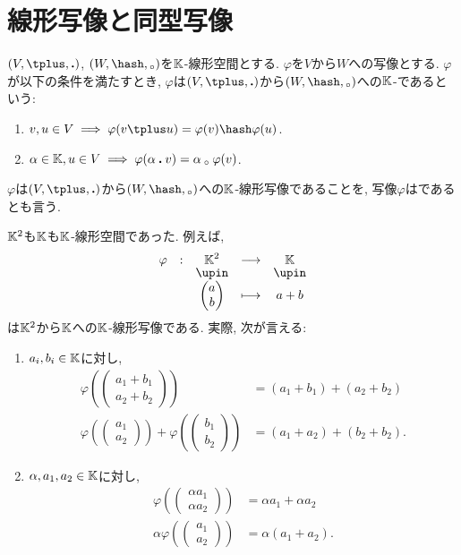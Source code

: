 \section{線形写像と同型写像}
\label{sec:linmap:def}
\begin{definition}
  $(V,\plus,\act)$, $(W,\pplus,\aact)$を$\mathbb{K}$-線形空間とする.
  $\varphi$を$V$から$W$への写像とする.
  $\varphi$が以下の条件を満たすとき,
  $\varphi$は$(V,\plus,\act)$から$(W,\pplus,\aact)$への$\mathbb{K}$-であるという:
  \begin{enumerate}
    \item $v,u\in V\implies \varphi(v\plus u)=\varphi(v)\pplus\varphi(u)$.
    \item $\alpha\in \mathbb{K}, u\in V\implies \varphi(\alpha\mathbin{\boldsymbol{.}} v)=\alpha\mathbin{{}_\circ}\varphi(v)$.
  \end{enumerate}
  $\varphi$は$(V,\plus,\act)$から$(W,\pplus,\aact)$への$\mathbb{K}$-線形写像であることを,
  写像$\varphi$はであるとも言う.
\end{definition}

\begin{example}
$\mathbb{K}^2$も$\mathbb{K}$も$\mathbb{K}$-線形空間であった.
例えば,
\begin{align*}
\shazo{\varphi}{\KK^2}{\KK}
{\begin{pmatrix}a\\b\end{pmatrix}}{a+b}
\end{align*}
は$\mathbb{K}^2$から$\mathbb{K}$への$\mathbb{K}$-線形写像である.
実際, 次が言える:
  \begin{enumerate}
    \item
    $a_i,b_i\in \mathbb{K}$に対し,
    \begin{align*}
    \varphi(\begin{pmatrix}a_1+b_1\\a_2+b_2\end{pmatrix})
    &=(a_1+b_1)+(a_2+b_2)\\
    \varphi(\begin{pmatrix}a_1\\a_2\end{pmatrix})+\varphi(\begin{pmatrix}b_1\\b_2\end{pmatrix})
    &=(a_1+a_2)+(b_2+b_2).
    \end{align*}
    \item
    $\alpha, a_1,a_2\in\mathbb{K}$に対し,
    \begin{align*}
    \varphi(\begin{pmatrix}\alpha a_1\\\alpha a_2\end{pmatrix})
    &=\alpha a_1+\alpha a_2\\
    \alpha \varphi(\begin{pmatrix}a_1\\a_2\end{pmatrix})
    &=\alpha(a_1+a_2).
    \end{align*}
  \end{enumerate}
\end{example}

